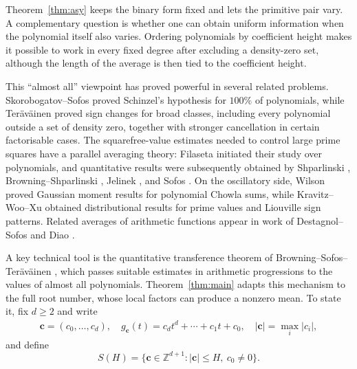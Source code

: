 \documentclass[12pt,reqno]{amsart}
\numberwithin{equation}{section}
\theoremstyle{definition}
\renewcommand{\le}{\leqslant}
\renewcommand{\ge}{\geqslant}
\newcommand{\ZZ}{\mathbb{Z}}
\newcommand{\cc}{\mathbf{c}}
\begin{document}
Theorem~\ref{thm:asy} keeps the binary form fixed and lets the primitive pair vary.
A complementary question is whether one can obtain uniform information when the polynomial itself also varies.
Ordering polynomials by coefficient height makes it possible to work in every fixed degree after excluding a density-zero set, although the length of the average is then tied to the coefficient height.

This ``almost all'' viewpoint has proved powerful in several related problems.
Skorobogatov--Sofos \cite{SS23} proved Schinzel's hypothesis for $100\%$ of polynomials, while Ter\"av\"ainen \cite{Ter24} proved sign changes for broad classes, including every polynomial outside a set of density zero, together with stronger cancellation in certain factorisable cases.
The squarefree-value estimates needed to control large prime squares have a parallel averaging theory: Filaseta \cite{Fil92} initiated their study over polynomials, and quantitative results were subsequently obtained by Shparlinski \cite{Shp13}, Browning--Shparlinski \cite{BrSh24}, Jelinek \cite{Jel}, and Sofos \cite{Sof26}.
On the oscillatory side, Wilson \cite{Wil25} proved Gaussian moment results for polynomial Chowla sums, while Kravitz--Woo--Xu \cite{KWX25} obtained distributional results for prime values and Liouville sign patterns.
Related averages of arithmetic functions appear in work of Destagnol--Sofos \cite{D-S-2} and Diao \cite{DiaoRandomBinary}.

A key technical tool is the quantitative transference theorem of Browning--Sofos--Ter\"av\"ainen \cite[Theorem~2.2]{BST}, which passes suitable estimates in arithmetic progressions to the values of almost all polynomials.
Theorem~\ref{thm:main} adapts this mechanism to the full root number, whose local factors can produce a nonzero mean.
To state it, fix $d\ge2$ and write
\begin{equation}\label{eq:def-gc}
\begin{gathered}
\cc=(c_0,\ldots,c_d),
\quad
g_\cc(t)=c_d t^d+\cdots+c_1 t+c_0,
\quad
|\cc|=\max_i|c_i|,
\end{gathered}
\end{equation}
and define
\begin{equation}\label{eq:def-SH}
S(H)=\{\cc\in\ZZ^{d+1}:|\cc|\le H,\ c_0\ne0\}.
\end{equation}
\end{document}
